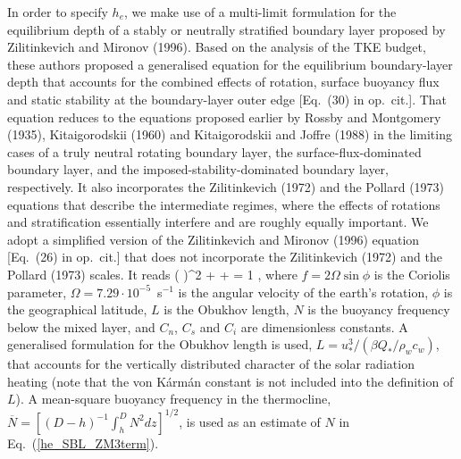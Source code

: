 In order to specify $h_e$, we make use of
a multi-limit formulation for the equilibrium depth of a stably
or neutrally stratified boundary layer proposed by Zilitinkevich and Mironov (1996)\nocite{zilitinmiro1996}.
Based on the analysis of the TKE budget,
these authors proposed a generalised equation for the equilibrium boundary-layer depth 
that accounts for the combined effects of rotation, surface buoyancy flux and
static stability at the boundary-layer outer edge [Eq.~(30) in op.~cit.].
That equation reduces to the equations proposed earlier by
Rossby and Montgomery (1935)\nocite{rossby1935}, Kitaigorodskii (1960)\nocite{Kitaigo1960}
and Kitaigorodskii and Joffre (1988)\nocite{kitaigo1988}
in the limiting cases of a truly neutral rotating boundary layer, 
the surface-flux-dominated boundary layer, 
and the imposed-stability-dominated boundary layer, respectively.
It also incorporates the Zilitinkevich (1972)\nocite{zilitin1972} and the Pollard \etal (1973)\nocite{pollard1973} 
equations that describe the intermediate regimes,
where the effects of rotations and stratification essentially interfere
and are roughly equally important.
We adopt a simplified version of the Zilitinkevich and Mironov (1996) equation
[Eq.~(26) in op.~cit.]
that does not incorporate the Zilitinkevich (1972) and the Pollard \etal (1973) scales.
It reads 
%
\beq\label{he_SBL_ZM3term}
\left(  \right)^2
+ 
+ 
= 1 ,
\eeq
%
where $f=2\Omega\sin\phi$ is the Coriolis parameter,
$\Omega=7.29\cdot10^{-5}$~s$^{-1}$ is the angular velocity of the earth's rotation,
$\phi$ is the geographical latitude,
$L$ is the Obukhov length,
$N$ is the buoyancy frequency below the mixed layer,
and $C_n$, $C_s$ and $C_i$ are dimensionless constants.
A generalised  formulation for the Obukhov length is used, 
$L=u_*^3/(\beta Q_*/\rho_w c_w)$,
that accounts for the vertically distributed character of the solar radiation heating
(note that the von K\'arm\'an constant is not included into the definition of $L$).
A mean-square buoyancy frequency in the thermocline,
$\overline{N}=\left[(D-h)^{-1}\int_h^DN^2dz\right]^{1/2}$,
is used as an estimate of $N$ in Eq.~(\ref{he_SBL_ZM3term}).

